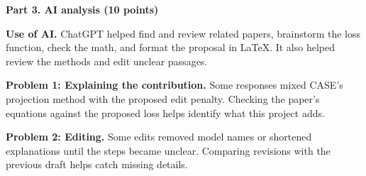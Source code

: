 \documentclass[11pt,letterpaper]{article}
\begin{document}
\clearpage
\textbf{Part 3. AI analysis (10 points)}

\textbf{Use of AI.} ChatGPT helped find and review related papers, brainstorm the loss function, check the math, and format the proposal in LaTeX. It also helped review the methods and edit unclear passages.

\textbf{Problem 1: Explaining the contribution.} Some responses mixed CASE's projection method with the proposed edit penalty. Checking the paper's equations against the proposed loss helps identify what this project adds.

\textbf{Problem 2: Editing.} Some edits removed model names or shortened explanations until the steps became unclear. Comparing revisions with the previous draft helps catch missing details.
\end{document}
